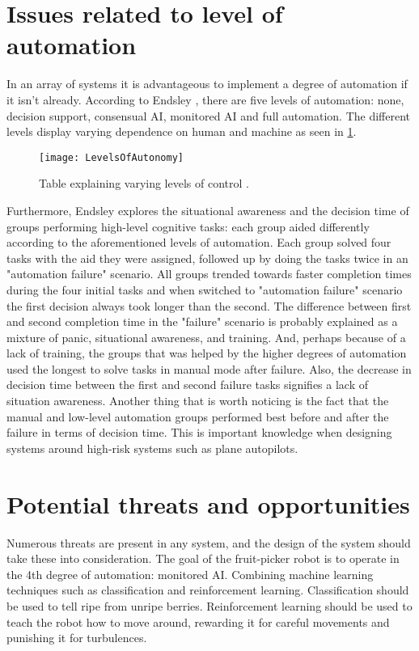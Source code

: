 \documentclass[%
oneside,    %
project,    %
nosummary   %
]{USN-MSc}
\begin{document}
\section{Issues related to level of automation}
\label{sec:issuesLevelAutomation}
In an array of systems it is advantageous to implement a degree of automation if it isn't already. According to Endsley \cite{article}, there are five levels of automation: none, decision support, consensual AI, monitored AI and full automation. The different levels display varying dependence on human and machine as seen in \ref{fig:levelsOfAuto}.

\begin{figure}[!ht]
  \centering
  \texttt{[image: LevelsOfAutonomy]}
  \caption{Table explaining varying levels of control \cite{article}.}
  \label{fig:levelsOfAuto}
\end{figure}

Furthermore, Endsley \cite{article} explores the situational awareness and the decision time of groups performing high-level cognitive tasks: each group aided differently according to the aforementioned levels of automation. Each group solved four tasks with the aid they were assigned, followed up by doing the tasks twice in an "automation failure" scenario. All groups trended towards faster completion times during the four initial tasks and when switched to "automation failure" scenario the first decision always took longer than the second. The difference between first and second completion time in the "failure" scenario is probably explained as a mixture of panic, situational awareness, and training. And, perhaps because of a lack of training, the groups that was helped by the higher degrees of automation used the longest to solve tasks in manual mode after failure. Also, the decrease in decision time between the first and second failure tasks signifies a lack of situation awareness. Another thing that is worth noticing is the fact that the manual and low-level automation groups performed best before and after the failure in terms of decision time. This is important knowledge when designing systems around high-risk systems such as plane autopilots.

\section{Potential threats and opportunities}
\label{sec:threatsOpportunities}

Numerous threats are present in any system, and the design of the system should take these into consideration. The goal of the fruit-picker robot is to operate in the 4th degree of automation: monitored AI. Combining machine learning techniques such as classification and reinforcement learning. Classification should be used to tell ripe from unripe berries. Reinforcement learning should be used to teach the robot how to move around, rewarding it for careful movements and punishing it for turbulences.
\end{document}
